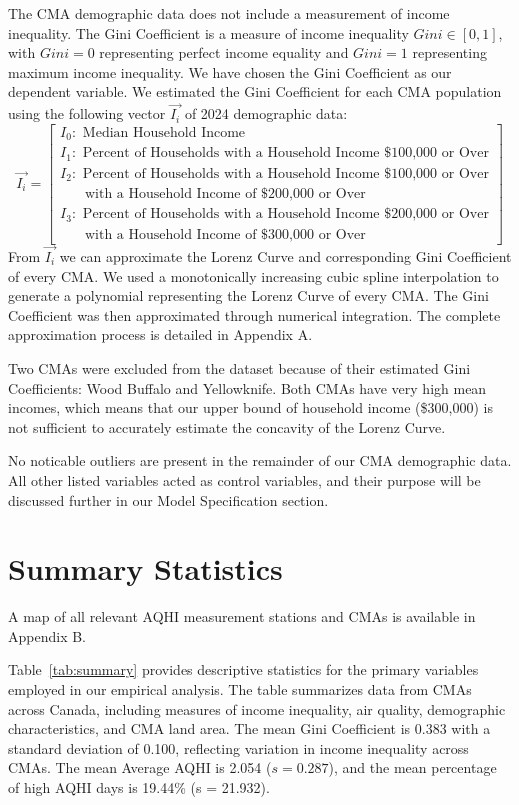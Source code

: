 \documentclass[AEJ]{AEA}
\begin{document}
The CMA demographic data does not include a measurement of income inequality. 
The Gini Coefficient is a measure of income inequality $Gini \in [0,1]$, with $Gini=0$
representing perfect income equality and $Gini=1$ representing maximum income 
inequality. We have chosen the Gini Coefficient as our dependent variable. We 
estimated the Gini Coefficient for each CMA population using the following 
vector $\vec{I_i}$ of 2024 demographic data:
\[
\vec{I_i} =
\left[
\begin{array}{l}
I_0\!: \text{ Median Household Income} \\[1ex]
I_1\!: \text{ Percent of Households with a Household Income \$100{,}000 or Over} \\[1ex]
I_2\!: \text{ Percent of Households with a Household Income \$100{,}000 or Over} \\
\quad\ \ \text{ with a Household Income of \$200{,}000 or Over} \\[1ex]
I_3\!: \text{ Percent of Households with a Household Income \$200{,}000 or Over} \\
\quad\ \ \text{ with a Household Income of \$300{,}000 or Over}
\end{array}
\right]
\]
From $\vec{I_i}$ we can approximate the Lorenz Curve and corresponding Gini Coefficient
of every CMA. We used a monotonically increasing cubic spline interpolation to
generate a polynomial representing the Lorenz Curve of every CMA. The Gini Coefficient 
was then approximated through numerical integration. The
complete approximation process is detailed in Appendix A.

Two CMAs were excluded from the dataset because of their estimated Gini Coefficients: Wood
Buffalo and Yellowknife. Both CMAs have very high mean incomes, which means that
our upper bound of household income (\$300,000) is not sufficient to accurately
estimate the concavity of the Lorenz Curve.

No noticable outliers are present in the remainder of our CMA demographic data.
All other listed variables acted as control variables, and their purpose will be
discussed further in our Model Specification section.

\section{Summary Statistics}

A map of all relevant AQHI measurement stations and CMAs is available in Appendix B.

Table~\ref{tab:summary} provides descriptive statistics for the primary 
variables employed in our empirical analysis. The table summarizes data from
CMAs across Canada, including measures of income inequality, air quality, demographic characteristics,
and CMA land area. The mean Gini Coefficient is 0.383 with a standard deviation of 0.100, 
reflecting variation in income inequality across CMAs. The mean Average AQHI is 2.054 
($s = 0.287$), and the mean percentage of high AQHI days is 19.44\% (s = 21.932).
\end{document}
